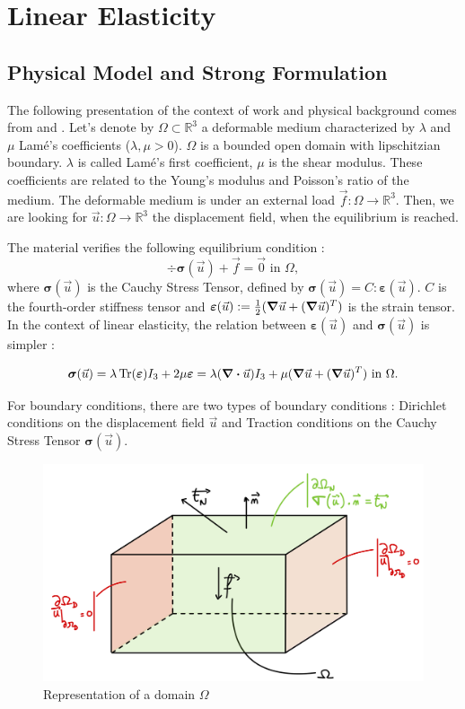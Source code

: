 \documentclass[a4paper,12pt,twoside]{report}
\newcommand{\mtr}{\mathbb{R}}
\begin{document}
\chapter{Linear Elasticity}
\label{chap:linear_elasticity}

\section{Physical Model and Strong Formulation}
The following presentation of the context of work and physical background comes from \cite{gould_introduction_2013} and \cite{ern_theory_2004}.
Let's denote by $\Omega \subset \mtr^3$ a deformable medium characterized by $\lambda$ and $\mu$ Lamé's coefficients ($\lambda, \mu > 0$). $\Omega$ is a bounded open domain with lipschitzian boundary. $\lambda$ is called Lamé's first coefficient, $\mu$ is the shear modulus. These coefficients are related to the Young's modulus and Poisson's ratio of the medium. The deformable medium is under an external load $\vec f : \Omega \rightarrow \mtr^3$. Then, we are looking for $\vec u : \Omega \rightarrow \mtr^3$ the displacement field, when the equilibrium is reached. 

The material verifies the following equilibrium condition : 
\begin{equation}
\label{eq:equilibrium}
    \div \boldsymbol{\sigma} (\vec u) + \vec f = \vec 0 \text{ in } \Omega,
\end{equation}
where $\boldsymbol{\sigma} (\vec u)$ is the Cauchy Stress Tensor, defined by $\boldsymbol{\sigma} (\vec u) = C : \boldsymbol{\varepsilon} (\vec u)$. $C$ is the fourth-order stiffness tensor and $\boldsymbol{\varepsilon} (\vec u) := \frac{1}{2}(\grad \vec u + (\grad \vec u)^T)$ is the strain tensor. In the context of linear elasticity, the relation between $\boldsymbol{\varepsilon} (\vec u)$ and $\boldsymbol{\sigma} (\vec u)$ is simpler : 

\begin{equation}
\label{eq:hooklaw}
    \boldsymbol{\sigma} (\vec u) = \lambda \Tr(\boldsymbol{\varepsilon}) I_3 + 2\mu \boldsymbol \varepsilon = \lambda (\div \vec u) I_3 + \mu (\grad \vec u + (\grad \vec u)^T) \text{ in } \Omega.
\end{equation}

For boundary conditions, there are two types of boundary conditions : Dirichlet conditions on the displacement field $\vec u$ and Traction conditions on the Cauchy Stress Tensor $\boldsymbol \sigma (\vec u)$. 


\begin{figure}[!h]
	\centering
	\includegraphics[width=0.61\linewidth]{figures/omega_domain}
	\caption{Representation of a domain $\Omega$}
	\label{fig:omegadomain}
\end{figure}
\end{document}
